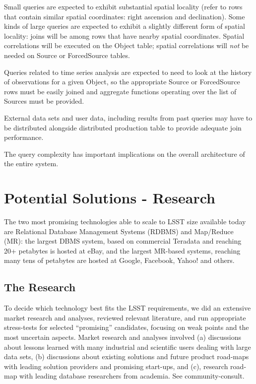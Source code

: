 \documentclass[DM,lsstdraft,toc]{lsstdoc}
\begin{document}
Small queries are expected to exhibit substantial spatial locality
(refer to rows that contain similar spatial coordinates: right ascension
and declination). Some kinds of large queries are expected to exhibit a
slightly different form of spatial locality: joins will be among rows
that have nearby spatial coordinates. Spatial correlations will be
executed on the Object table; spatial correlations will \emph{not} be
needed on Source or ForcedSource tables.

Queries related to time series analysis are expected to need to look at
the history of observations for a given Object, so the appropriate
Source or ForcedSource rows must be easily joined and aggregate
functions operating over the list of Sources must be provided.

External data sets and user data, including results from past queries
may have to be distributed alongside distributed production table to
provide adequate join performance.

The query complexity has important implications on the overall
architecture of the entire system.

\section{Potential Solutions -
Research}\label{potential-solutions}

The two most promising technologies able to scale to LSST size available
today are Relational Database Management Systems (RDBMS) and Map/Reduce
(MR): the largest DBMS system, based on commercial Teradata and reaching
20+ petabytes is hosted at eBay, and the largest MR-based systems,
reaching many tens of petabytes are hosted at Google, Facebook, Yahoo!
and others.

\subsection{The Research}\label{the-research}

To decide which technology best fits the LSST requirements, we did an
extensive market research and analyses, reviewed relevant literature,
and run appropriate stress-tests for selected ``promising'' candidates,
focusing on weak points and the most uncertain aspects. Market research
and analyses involved (a) discussions about lessons learned with many
industrial and scientific users dealing with large data sets, (b)
discussions about existing solutions and future product road-maps with
leading solution providers and promising start-ups, and (c), research
road-map with leading database researchers from academia. See
community-consult.
\end{document}

